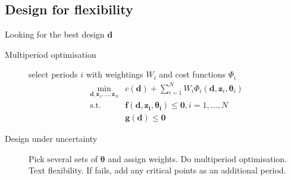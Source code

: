 \documentclass[a4paper,twocolumn,10pt]{article}
\begin{document}
\subsection{Design for flexibility}
Looking for the best design $\boldsymbol{d}$
\begin{description}
    \item[Multiperiod optimisation] select periods $i$ with weightings $W_i$ and cost functions $\Phi_i$
        \begin{equation*}
            \begin{array}{rc}
                \min _{\boldsymbol{d}, \mathbf{z}_{1}, \ldots, \mathbf{z}_{N}} & c(\boldsymbol{d})+\sum_{i=1}^{N} W_{i} \Phi_{i}\left(\boldsymbol{d}, \mathbf{z}_{i}, \boldsymbol{\theta}_{i}\right) \\
                \text{s.t. }& \boldsymbol{f}\left(\boldsymbol{d}, \mathbf{z}_{\boldsymbol{i}}, \boldsymbol{\theta}_{\boldsymbol{i}}\right) \leq \mathbf{0}, i=1, \ldots, N \\
                & \boldsymbol{g}(\boldsymbol{d}) \leq \mathbf{0}
            \end{array}
        \end{equation*} 
    \item[Design under uncertainty] Pick several sets of $\boldsymbol{\theta}$ and assign weights. Do multiperiod optimisation. Text flexibility. If fails, add any critical points as an additional period.
\end{description}
\end{document}
